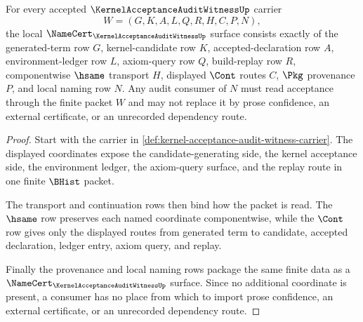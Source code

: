 \begin{theorem}
\label{thm:kernel-acceptance-audit-witness-namecert-obligations}
For every accepted $\KernelAcceptanceAuditWitnessUp$ carrier
$$
W=(G,K,A,L,Q,R,H,C,P,N),
$$
the local $\NameCert_{\KernelAcceptanceAuditWitnessUp}$ surface consists exactly of the generated-term row $G$, kernel-candidate row $K$, accepted-declaration row $A$, environment-ledger row $L$, axiom-query row $Q$, build-replay row $R$, componentwise $\hsame$ transport $H$, displayed $\Cont$ routes $C$, $\Pkg$ provenance $P$, and local naming row $N$. Any audit consumer of $N$ must read acceptance through the finite packet $W$ and may not replace it by prose confidence, an external certificate, or an unrecorded dependency route.
\end{theorem}
\begin{proof}
Start with the carrier in \autoref{def:kernel-acceptance-audit-witness-carrier}. The displayed coordinates expose the candidate-generating side, the kernel acceptance side, the environment ledger, the axiom-query surface, and the replay route in one finite $\BHist$ packet.

The transport and continuation rows then bind how the packet is read. The $\hsame$ row preserves each named coordinate componentwise, while the $\Cont$ row gives only the displayed routes from generated term to candidate, accepted declaration, ledger entry, axiom query, and replay.

Finally the provenance and local naming rows package the same finite data as a $\NameCert_{\KernelAcceptanceAuditWitnessUp}$ surface. Since no additional coordinate is present, a consumer has no place from which to import prose confidence, an external certificate, or an unrecorded dependency route.
\end{proof}

